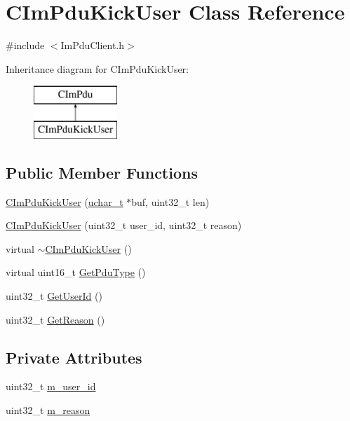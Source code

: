 \hypertarget{class_c_im_pdu_kick_user}{}\section{C\+Im\+Pdu\+Kick\+User Class Reference}
\label{class_c_im_pdu_kick_user}


{\ttfamily \#include $<$Im\+Pdu\+Client.\+h$>$}

Inheritance diagram for C\+Im\+Pdu\+Kick\+User\+:\begin{figure}[H]
\begin{center}
\leavevmode
\includegraphics[height=2.000000cm]{class_c_im_pdu_kick_user}
\end{center}
\end{figure}
\subsection*{Public Member Functions}
\begin{DoxyCompactItemize}
\item 
\hyperlink{class_c_im_pdu_kick_user_a09b8cc3e1f78cbeccda9102d6ac71623}{C\+Im\+Pdu\+Kick\+User} (\hyperlink{base_2ostype_8h_a124ea0f8f4a23a0a286b5582137f0b8d}{uchar\+\_\+t} $\ast$buf, uint32\+\_\+t len)
\item 
\hyperlink{class_c_im_pdu_kick_user_a12e0d0f3eb3b03d3a85bc0e57650b3e9}{C\+Im\+Pdu\+Kick\+User} (uint32\+\_\+t user\+\_\+id, uint32\+\_\+t reason)
\item 
virtual \hyperlink{class_c_im_pdu_kick_user_abbe346f4cd7d761e3bcaa94c5536881b}{$\sim$\+C\+Im\+Pdu\+Kick\+User} ()
\item 
virtual uint16\+\_\+t \hyperlink{class_c_im_pdu_kick_user_a887d779123b1248719825b3298bcc180}{Get\+Pdu\+Type} ()
\item 
uint32\+\_\+t \hyperlink{class_c_im_pdu_kick_user_a731ff973061db195a5ec1565f14f4556}{Get\+User\+Id} ()
\item 
uint32\+\_\+t \hyperlink{class_c_im_pdu_kick_user_adee283f812dc1373f15fcb2a3ab65798}{Get\+Reason} ()
\end{DoxyCompactItemize}
\subsection*{Private Attributes}
\begin{DoxyCompactItemize}
\item 
uint32\+\_\+t \hyperlink{class_c_im_pdu_kick_user_a1aabb6b3cbff828a8da3f7bf7e0fd614}{m\+\_\+user\+\_\+id}
\item 
uint32\+\_\+t \hyperlink{class_c_im_pdu_kick_user_aa2ffba96938bddf9a93a347b3ec1902c}{m\+\_\+reason}
\end{DoxyCompactItemize}
